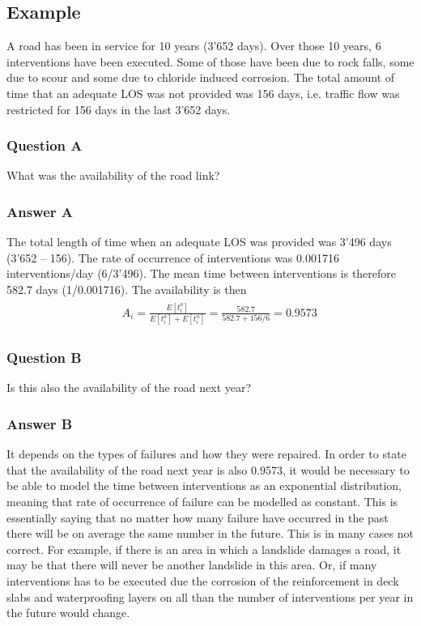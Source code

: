 \subsection{Example}
A road has been in service for 10 years (3'652 days). Over those 10 years, 6
interventions have been executed. Some of those have been due to rock falls, some
due to scour and some due to chloride induced corrosion. The total amount of time
that an adequate LOS was not provided was 156 days, i.e. traffic flow was
restricted for 156 days in the last 3'652 days.
\subsubsection{Question A}
What was the availability of the road link?
\subsubsection{Answer A}
The total length of time when an adequate LOS was provided was 3'496 days (3'652
-- 156). The rate of occurrence of interventions was 0.001716 interventions/day
(6/3'496). The mean time between interventions is therefore 582.7 days
(1/0.001716). The availability is then
\begin{eqnarray}
&& \begin{array}{l}
 {A_i} = \frac{{E\left[ {t_i^a} \right]}}{{E\left[ {t_i^a} \right] + E\left[
{t_i^n} \right]}} = \frac{{582.7}}{{582.7 + 156/6}} = 0.9573
\end{array} \label{avaimaineq:2}
\end{eqnarray}
\subsubsection{Question B}
Is this also the availability of the road next year?
\subsubsection{Answer B}
It depends on the types of failures and how they were repaired. In order to
state that the availability of the road next year is also 0.9573, it would be
necessary to be able to model the time between interventions as an exponential
distribution, meaning that rate of occurrence of failure can be modelled as
constant. This is essentially saying that no matter how many failure have
occurred in the past there will be on average the same number in the future. This
is in many cases not correct. For example, if there is an area in which a
landslide damages a road, it may be that there will never be another landslide in
this area. Or, if many interventions has to be executed due the corrosion of the
reinforcement in deck slabs and waterproofing layers on all than the number of
interventions per year in the future would change.
